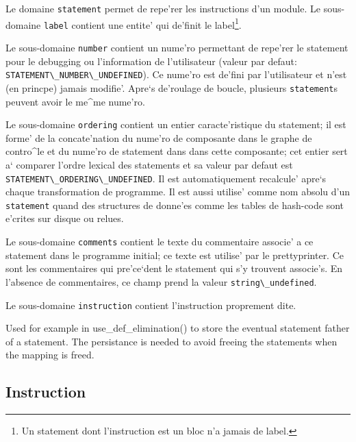 { 
Le
domaine \verb/statement/ permet de repe'rer les instructions d'un
module.  Le sous-domaine \verb/label/ contient une entite' qui de'finit
le label\footnote{Un statement dont l'instruction est un bloc n'a
jamais de label.}.

Le sous-domaine \verb/number/ contient un nume'ro permettant
de repe'rer le statement pour le debugging ou l'information de
l'utilisateur (valeur par defaut:
\verb+STATEMENT\_NUMBER\_UNDEFINED+). Ce nume'ro est de'fini par
l'utilisateur et n'est (en princpe) jamais modifie'. Apre`s de'roulage
de boucle, plusieurs \verb/statement/s peuvent avoir le me^me nume'ro.

Le sous-domaine \verb/ordering/ contient un entier caracte'ristique du
statement; il est forme' de la concate'nation du nume'ro de composante
dans le graphe de contro^le et du nume'ro de statement dans dans cette
composante; cet entier sert a` comparer l'ordre lexical des statements
et sa valeur par defaut est \verb+STATEMENT\_ORDERING\_UNDEFINED+. Il
est automatiquement recalcule' apre`s chaque transformation de
programme. Il est aussi utilise' comme nom absolu d'un \verb/statement/
quand des structures de donne'es comme les tables de hash-code sont
e'crites sur disque ou relues.

Le sous-domaine {\tt comments} contient le texte du commentaire associe'
a ce statement dans le programme initial; ce texte est utilise' par le
prettyprinter. Ce sont les commentaires qui pre'ce`dent le statement
qui s'y trouvent associe's. En l'absence de commentaires, ce champ
prend la valeur \verb/string\_undefined/.

Le sous-domaine \verb/instruction/ contient
l'instruction proprement dite.
}

{
  Used for example in use_def_elimination() to store the eventual
  statement father of a statement. The persistance is needed to avoid
  freeing the statements when the mapping is freed.
}

\subsection{Instruction}
\label{subsection-instruction}

